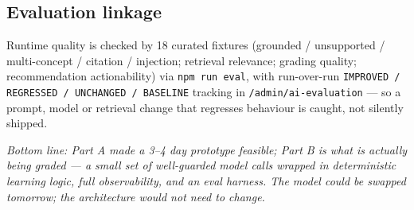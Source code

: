 \documentclass[11pt,a4paper]{article}
\begin{document}
\subsection{Evaluation linkage}

Runtime quality is checked by 18 curated fixtures (grounded / unsupported / multi-concept / citation / injection; retrieval relevance; grading quality; recommendation actionability) via \texttt{npm run eval}, with run-over-run \texttt{IMPROVED / REGRESSED / UNCHANGED / BASELINE} tracking in \texttt{/admin/ai-evaluation} --- so a prompt, model or retrieval change that regresses behaviour is caught, not silently shipped.

\medskip
\noindent\textit{Bottom line: Part A made a 3--4 day prototype feasible; Part B is what is actually being graded --- a small set of well-guarded model calls wrapped in deterministic learning logic, full observability, and an eval harness. The model could be swapped tomorrow; the architecture would not need to change.}
\end{document}
